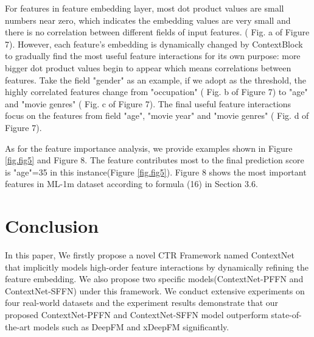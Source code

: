 \documentclass[sigconf]{acmart}
\begin{document}
For features in feature embedding layer, most dot product values are small numbers near zero, which indicates the embedding values are very small and there is no correlation between different fields of input features. ( Fig. a of Figure 7). However, each feature’s embedding is dynamically changed by ContextBlock to gradually find the most useful feature interactions for its own purpose: more bigger dot product values begin to appear which means correlations between features. Take the field "gender" as an example, if we adopt  as the threshold, the highly correlated features change from "occupation" ( Fig. b of Figure 7) to "age" and "movie genres" ( Fig. c of Figure 7). The final useful feature interactions focus on the features from field
"age", "movie year" and "movie genres" ( Fig. d of Figure 7).


As for the feature importance analysis, we provide examples shown in Figure \ref{fig.fig5} and Figure 8. The feature contributes most to the final prediction score is {"age"=35} in this instance(Figure \ref{fig.fig5}). Figure 8 shows the most important features  in ML-1m dataset according to formula (16) in Section 3.6.








\section{Conclusion}

In this paper, We firstly propose a novel CTR Framework named ContextNet that implicitly models high-order feature interactions by dynamically refining the feature embedding. We also propose two specific models(ContextNet-PFFN and ContextNet-SFFN) under this framework. We conduct extensive experiments on four real-world datasets and the experiment results demonstrate that our proposed ContextNet-PFFN and ContextNet-SFFN model outperform state-of-the-art models such as DeepFM and xDeepFM significantly.







\end{document}
